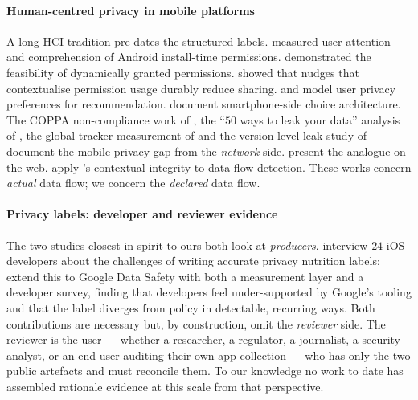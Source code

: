\documentclass[11pt,a4paper]{article}
\begin{document}
\paragraph{Human-centred privacy in mobile platforms}
A long HCI tradition pre-dates the structured labels.
\citet{felt2012android} measured user attention and comprehension of
Android install-time permissions. \citet{wijesekera2017feasibility}
demonstrated the feasibility of dynamically granted permissions.
\citet{almuhimedi2015your} showed that nudges that contextualise
permission usage durably reduce sharing. \citet{lin2014modeling} and
\citet{liu2016follow} model user privacy preferences for
recommendation. \citet{egelman2013choice} document smartphone-side
choice architecture. The COPPA non-compliance work of
\citet{reyes2018wont}, the ``$50$ ways to leak your data'' analysis of
\citet{reardon2019fifty}, the global tracker measurement of
\citet{razaghpanah2018apps} and the version-level leak study of
\citet{ren2018bug} document the mobile privacy gap from the
\emph{network} side. \citet{englehardt2016online} present the analogue
on the web. \citet{shvartzshnaider2019going} apply
\citeauthor{nissenbaum2004privacy}'s contextual integrity to data-flow
detection. These works concern \emph{actual} data flow; we concern the
\emph{declared} data flow.

\paragraph{Privacy labels: developer and reviewer evidence}
The two studies closest in spirit to ours both look at
\emph{producers}. \citet{li2022understanding} interview $24$ iOS
developers about the challenges of writing accurate privacy nutrition
labels; \citet{khandelwal2024unpacking} extend this to Google Data
Safety with both a measurement layer and a developer survey, finding
that developers feel under-supported by Google's tooling and that the
label diverges from policy in detectable, recurring ways. Both
contributions are necessary but, by construction, omit the
\emph{reviewer} side. The reviewer is the user --- whether a researcher,
a regulator, a journalist, a security analyst, or an end user
auditing their own app collection --- who has only the two public
artefacts and must reconcile them. To our knowledge no work to date
has assembled rationale evidence at this scale from that perspective.
\end{document}
